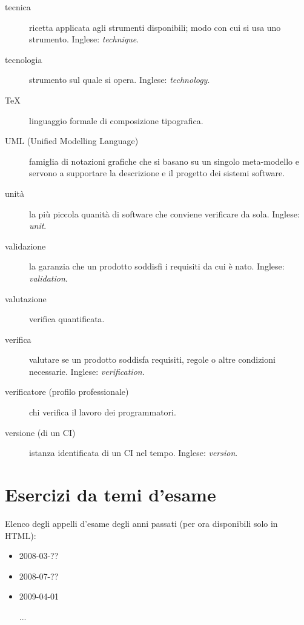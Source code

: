 \documentclass[a4paper]{article}
\begin{document}
\begin{description}
	\item[tecnica] 

			ricetta applicata agli strumenti disponibili; modo con cui si usa uno strumento. Inglese: \emph{technique}.
			
	\item[tecnologia] 

			strumento sul quale si opera. Inglese: \emph{technology}.
			
	\item[TeX] 

			linguaggio formale di composizione tipografica.
			
	\item[UML (Unified Modelling Language)] 

			famiglia di notazioni grafiche che si basano su un singolo meta-modello e servono a supportare la descrizione e il progetto dei sistemi software.
			
	\item[unità] 

			la più piccola quanità di software che conviene verificare da sola. Inglese: \emph{unit}.
			
	\item[validazione] 

			la garanzia che un prodotto soddisfi i requisiti da cui è nato. Inglese: \emph{validation}.
			
	\item[valutazione] 

			verifica quantificata.
			
	\item[verifica] 

			valutare se un prodotto soddisfa requisiti, regole o altre condizioni necessarie. Inglese: \emph{verification}.
			
	\item[verificatore (profilo professionale)] 

			chi verifica il lavoro dei programmatori.
			
	\item[versione (di un CI)] 

			istanza identificata di un CI nel tempo. Inglese: \emph{version}.
		
	\end{description}

	


		
	\newpage
	\appendix
	\section{Esercizi da temi d'esame}

		
Elenco degli appelli d'esame degli anni passati (per ora disponibili solo in HTML):
		
	\begin{itemize}
		
			
	\item 2008-03-??
			
	\item 2008-07-??
			
	\item 2009-04-01
			
	\item [...]
		
	\end{itemize}

	
\end{document}

